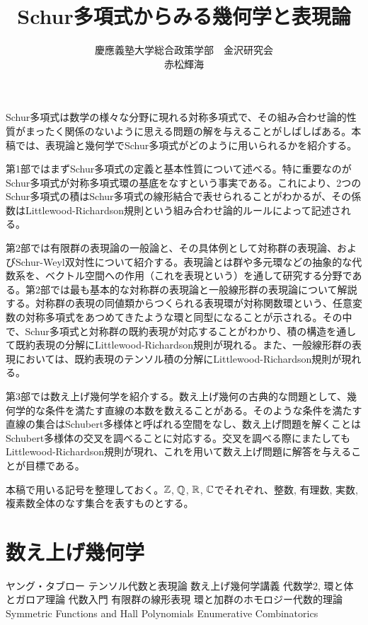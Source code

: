 \documentclass{ltjsarticle}
\title{Schur多項式からみる幾何学と表現論}
\author{慶應義塾大学総合政策学部　金沢研究会\\赤松輝海}
\date{}
\begin{document}
\maketitle
Schur多項式は数学の様々な分野に現れる対称多項式で、その組み合わせ論的性質がまったく関係のないように思える問題の解を与えることがしばしばある。本稿では、表現論と幾何学でSchur多項式がどのように用いられるかを紹介する。


第1部ではまずSchur多項式の定義と基本性質について述べる。特に重要なのがSchur多項式が対称多項式環の基底をなすという事実である。これにより、2つのSchur多項式の積はSchur多項式の線形結合で表せられることがわかるが、その係数はLittlewood-Richardson規則という組み合わせ論的ルールによって記述される。


第2部では有限群の表現論の一般論と、その具体例として対称群の表現論、およびSchur-Weyl双対性について紹介する。表現論とは群や多元環などの抽象的な代数系を、ベクトル空間への作用（これを表現という）を通して研究する分野である。第2部では最も基本的な対称群の表現論と一般線形群の表現論について解説する。対称群の表現の同値類からつくられる表現環が対称関数環という、任意変数の対称多項式をあつめてきたような環と同型になることが示される。その中で、Schur多項式と対称群の既約表現が対応することがわかり、積の構造を通して既約表現の分解にLittlewood-Richardson規則が現れる。また、一般線形群の表現においては、既約表現のテンソル積の分解にLittlewood-Richardson規則が現れる。


第3部では数え上げ幾何学を紹介する。数え上げ幾何の古典的な問題として、幾何学的な条件を満たす直線の本数を数えることがある。そのような条件を満たす直線の集合はSchubert多様体と呼ばれる空間をなし、数え上げ問題を解くことはSchubert多様体の交叉を調べることに対応する。交叉を調べる際にまたしてもLittlewood-Richardson規則が現れ、これを用いて数え上げ問題に解答を与えることが目標である。


本稿で用いる記号を整理しておく。$\mathbb{Z}$, $\mathbb{Q}$, $\mathbb{R}$, $\mathbb{C}$でそれぞれ、整数, 有理数, 実数, 複素数全体のなす集合を表すものとする。

\newpage
\tableofcontents

\newpage



\newpage


\newpage
\part{数え上げ幾何学}


\newpage
\begin{thebibliography}{99}
   ヤング・タブロー
   テンソル代数と表現論
   数え上げ幾何学講義
   代数学2, 環と体とガロア理論
   代数入門
   有限群の線形表現
   環と加群のホモロジー代数的理論
   Symmetric Functions and Hall Polynomials
   Enumerative Combinatorics
\end{thebibliography}
\end{document}
